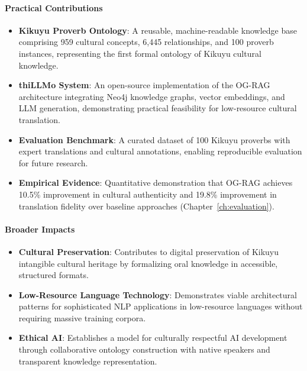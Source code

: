 \paragraph{Practical Contributions}

\begin{itemize}
    \item \textbf{Kikuyu Proverb Ontology}: A reusable, machine-readable knowledge base comprising 959 cultural concepts, 6,445 relationships, and 100 proverb instances, representing the first formal ontology of Kikuyu cultural knowledge.
    
    \item \textbf{thiLLMo System}: An open-source implementation of the OG-RAG architecture integrating Neo4j knowledge graphs, vector embeddings, and LLM generation, demonstrating practical feasibility for low-resource cultural translation.
    
    \item \textbf{Evaluation Benchmark}: A curated dataset of 100 Kikuyu proverbs with expert translations and cultural annotations, enabling reproducible evaluation for future research.
    
    \item \textbf{Empirical Evidence}: Quantitative demonstration that OG-RAG achieves 10.5\% improvement in cultural authenticity and 19.8\% improvement in translation fidelity over baseline approaches (Chapter~\ref{ch:evaluation}).
\end{itemize}

\paragraph{Broader Impacts}

\begin{itemize}
    \item \textbf{Cultural Preservation}: Contributes to digital preservation of Kikuyu intangible cultural heritage by formalizing oral knowledge in accessible, structured formats.
    
    \item \textbf{Low-Resource Language Technology}: Demonstrates viable architectural patterns for sophisticated NLP applications in low-resource languages without requiring massive training corpora.
    
    \item \textbf{Ethical AI}: Establishes a model for culturally respectful AI development through collaborative ontology construction with native speakers and transparent knowledge representation.
\end{itemize}

